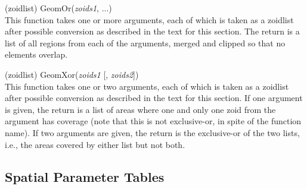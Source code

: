 \begin{description}
\item{(zoidlist) \vt GeomOr({\it zoids1}, ...)}\\
This function takes one or more arguments, each of which is taken as a
zoidlist after possible conversion as described in the text for this
section.  The return is a list of all regions from each of the
arguments, merged and clipped so that no elements overlap.

\item{(zoidlist) \vt GeomXor({\it zoids1} [, {\it zoids2\/}])}\\
This function takes one or two arguments, each of which is taken as a
zoidlist after possible conversion as described in the text for this
section.  If one argument is given, the return is a list of areas
where one and only one zoid from the argument has coverage (note that
this is not exclusive-or, in spite of the function name).  If two
arguments are given, the return is the exclusive-or of the two lists,
i.e., the areas covered by either list but not both.

\end{description}


\subsection{Spatial Parameter Tables}
\label{spt}

